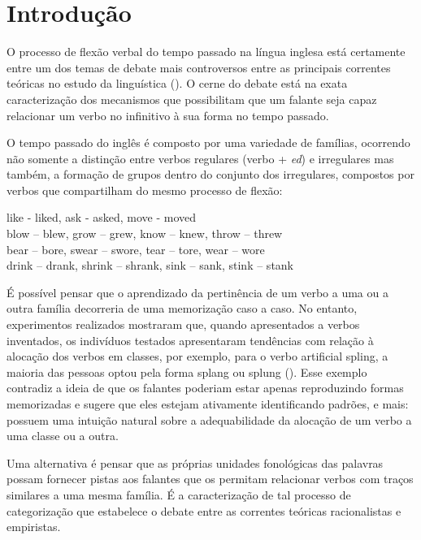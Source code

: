 \chapter{Introdução}
\label{ch:01-introduction}

O processo de flexão verbal do tempo passado na língua inglesa está certamente entre um dos temas de debate mais controversos entre as principais correntes teóricas no estudo da linguística (\cite{chomsky:1968,Pinker:1988,rumelhart:1986}). O cerne do debate está na exata caracterização dos mecanismos que possibilitam que um falante seja capaz relacionar um verbo no infinitivo à sua forma no tempo passado. 

O tempo passado do inglês é composto por uma variedade de famílias, ocorrendo não somente a distinção entre verbos regulares (verbo + \textit{ed}) e irregulares mas também, a formação de grupos dentro do conjunto dos irregulares, compostos por verbos que compartilham do mesmo processo de flexão:

\begin{center}
like - liked, ask - asked, move - moved\\
blow – blew, grow – grew, know – knew, throw – threw\\
bear – bore, swear – swore, tear – tore, wear – wore\\
drink – drank, shrink – shrank, sink – sank, stink – stank \\
\end{center}

É possível pensar que o aprendizado da pertinência de um verbo a uma ou a outra família decorreria de uma memorização caso a caso. No entanto, experimentos realizados mostraram que, quando apresentados a verbos inventados, os indivíduos testados apresentaram tendências com relação à alocação dos verbos em classes, por exemplo, para o verbo artificial spling, a maioria das pessoas optou pela forma splang  ou splung (\cite{Bybee:1983}). Esse exemplo contradiz a ideia de que os falantes poderiam estar apenas reproduzindo formas memorizadas e sugere que eles estejam ativamente identificando padrões, e mais: possuem uma intuição natural sobre a adequabilidade da alocação de um verbo a uma classe ou a outra.

Uma alternativa é pensar que as próprias unidades fonológicas das palavras possam fornecer pistas aos falantes que os permitam relacionar verbos com traços similares a uma mesma família. É a caracterização de tal processo de categorização que estabelece o debate entre as correntes teóricas racionalistas e empiristas.  

